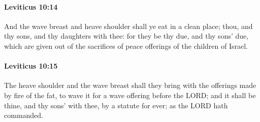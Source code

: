 		\paragraph{Leviticus 10:14} %
			\label{LEVITICUS-10-14}

			And the wave breast and heave shoulder shall ye eat in a clean place; thou, and thy sons, and thy daughters with thee: for they be thy due, and thy sons’ due, which are given out of the sacrifices of peace offerings of the children of Israel.


		\paragraph{Leviticus 10:15} %
			\label{LEVITICUS-10-15}

			The heave shoulder and the wave breast shall they bring with the offerings made by fire of the fat, to wave it for a wave offering before the LORD; and it shall be thine, and thy sons’ with thee, by a statute for ever; as the LORD hath commanded.

